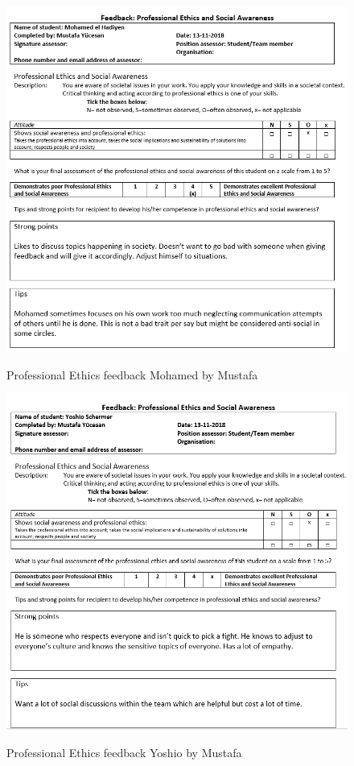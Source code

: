 \documentclass[12pt]{article}
\begin{document}
	\begin{figure}[p!]
		\centering
		\includegraphics[width=\columnwidth]{ProfEthMohamed2.PNG}\\
		\caption{Professional Ethics feedback Mohamed by Mustafa}
	\end{figure}
	\begin{figure}[p!]
		\centering
		\includegraphics[width=\columnwidth]{ProfEthYoshio2.PNG}\\
		\caption{Professional Ethics feedback Yoshio by Mustafa}
	\end{figure}
\end{document}

